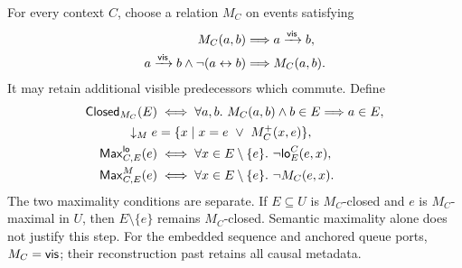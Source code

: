 \begin{definition}\label{def:metadata}
For every context $C$, choose a relation $M_C$ on events satisfying
\[
\begin{aligned}
 M_C(a,b)&\Longrightarrow a\mathrel{\xrightarrow{\mathsf{vis}}} b,\\
 a\mathrel{\xrightarrow{\mathsf{vis}}} b\land\neg(a\leftrightarrow b)
    &\Longrightarrow M_C(a,b).
\end{aligned}
\]
It may retain additional visible predecessors which commute. Define
\[
\begin{aligned}
 \mathsf{Closed}_{M_C}(E)&\iff
   \forall a,b.\ M_C(a,b)\land b\in E\Longrightarrow a\in E,\\
 \downarrow_M e&=\{x\mid x=e\ \lor\ M_C^+(x,e)\},\\
 \mathsf{Max}^{\mathsf{lo}}_{C,E}(e)&\iff
   \forall x\in E\setminus\{e\}.\ \neg\mathsf{lo}^C_E(e,x),\\
 \mathsf{Max}^{M}_{C,E}(e)&\iff
   \forall x\in E\setminus\{e\}.\ \neg M_C(e,x).
\end{aligned}
\]
The two maximality conditions are separate. If $E\subseteq U$ is
$M_C$-closed and $e$ is $M_C$-maximal in $U$, then
$E\setminus\{e\}$ remains $M_C$-closed. Semantic maximality alone does not
justify this step. For the embedded sequence and anchored queue ports,
$M_C=\mathsf{vis}$; their reconstruction past retains all causal metadata.
\end{definition}

